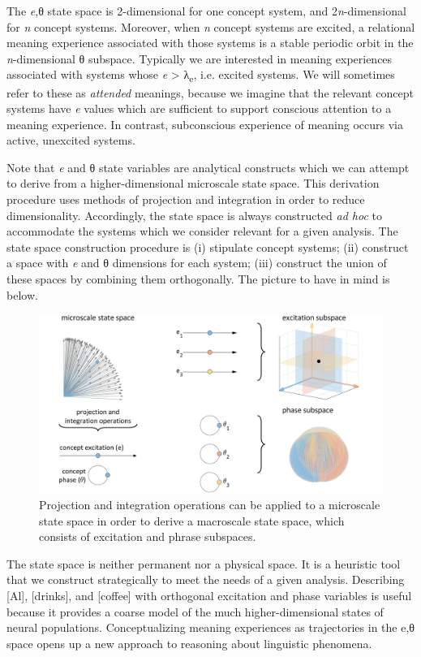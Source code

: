   The \textit{e},θ state space is 2-dimensional for one concept system, and 2\textit{n}{}-dimensional for \textit{n} concept systems. Moreover, when \textit{n} concept systems are excited, a relational meaning experience associated with those systems is a stable periodic orbit in the \textit{n}{}-dimensional θ subspace. Typically we are interested in meaning experiences associated with systems whose \textit{e} > λ\textsubscript{e}, i.e. excited systems. We will sometimes refer to these as \textit{attended} meanings, because we imagine that the relevant concept systems have \textit{e} values which are sufficient to support conscious attention to a meaning experience. In contrast, subconscious experience of meaning occurs via active, unexcited systems.

  Note that \textit{e} and θ state variables are analytical constructs which we can attempt to derive from a higher-dimensional microscale state space. This derivation procedure uses methods of projection and integration in order to reduce dimensionality. Accordingly, the state space is always constructed \textit{ad hoc} to accommodate the systems which we consider relevant for a given analysis. The state space construction procedure is (i) stipulate concept systems; (ii) construct a space with \textit{e} and θ dimensions for each system; (iii) construct the union of these spaces by combining them orthogonally. The picture to have in mind is below. 

  
\begin{figure}
\includegraphics[width=\textwidth]{figures/Tilsen-img14.png}
\caption{Projection and integration operations can be applied to a microscale state space in order to derive a macroscale state space, which consists of excitation and phrase subspaces.}
\label{fig:2:7}
\end{figure}
 

  The state space is neither permanent nor a physical space. It is a heuristic tool that we construct strategically to meet the needs of a given analysis. Describing [Al], [drinks], and [coffee] with orthogonal excitation and phase variables is useful because it provides a coarse model of the much higher-dimensional states of neural populations. Conceptualizing meaning experiences as trajectories in the e,θ space opens up a new approach to reasoning about linguistic phenomena.

